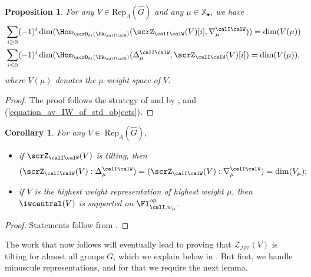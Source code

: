 \documentclass[10pt, reqno]{amsart}
\theoremstyle{plain}
\newtheorem{proposition}[theorem]{Proposition}
\newtheorem{corollary}[theorem]{Corollary}
\theoremstyle{definition}
\numberwithin{equation}{section}
\begin{document}
\begin{proposition}
	For any $V\in \mathrm{Rep}_\Lambda (\hat{G})$ and any $\mu\in \mathbb{X}_\bullet$, we have 
	\begin{align}
		&  \sum_{i\geq 0}  (-1)^i \dim (\Hom_{\scrD_{\mathrm{\acute{e}t}}(\Hk_{\calI\calW})} (\scrZ_{\calI\calW}(V)[i],\nabla_\mu^{\calI\calW}))=\dim (V(\mu))\\
		& \sum_{i\leq 0} (-1)^i  \dim (\Hom_{\scrD_\mathrm{\acute{e}t}(\Hk_{\calI\calW})} (\Delta_\mu^{\calI\calW},\scrZ_{\calI\calW}(V)[i])=\dim (V(\mu)),
	\end{align}
	where $V(\mu)$ denotes the $\mu$-weight space of $V$.
\end{proposition}
\begin{proof}
	The proof follows the strategy of \cite[Lemma 27]{AB09} and \cite[Proposition 6.5.4]{AR} by , and (\ref{equation_av_IW_of_std_objects}).
\end{proof}


\begin{corollary}\label{coro_mult_support_of_Z_IW}
	For any $V\in\ \mathrm{Rep}_\Lambda (\hat{G})$,
	\begin{itemize}
		\item [(1)]if $\scrZ_{{\calI\calW}}(V)$ is tilting, then
		\begin{equation}\label{equation_dimension_estimate_tilting_sheaves}
			(\scrZ_{{\calI\calW}}(V):\Delta_\mu^{\calI\calW})=(\scrZ_{{\calI\calW}}(V):\nabla_\mu^{\calI\calW})=\dim (V_\mu);
		\end{equation}
		\item[(2)] if $V$ is the highest weight representation of highest weight $\mu$, then $\iwcentral(V)$ is supported on $\Fl^{\mathrm{op}}_{\calI,w_\mu}$.
	\end{itemize}
	
	
\end{corollary}
\begin{proof}
	Statements follow from \cite[Remark 6.5.5, Corollary 6.5.6]{AR}.
\end{proof}


The work that now follows will eventually lead to proving that $\mathscr{Z}_{\mathcal{I}\mathcal{W}}(V)$ is tilting for almost all groups $G$, which we explain below in . But first, we handle minuscule representations, and for that we require the next lemma.
\end{document}
